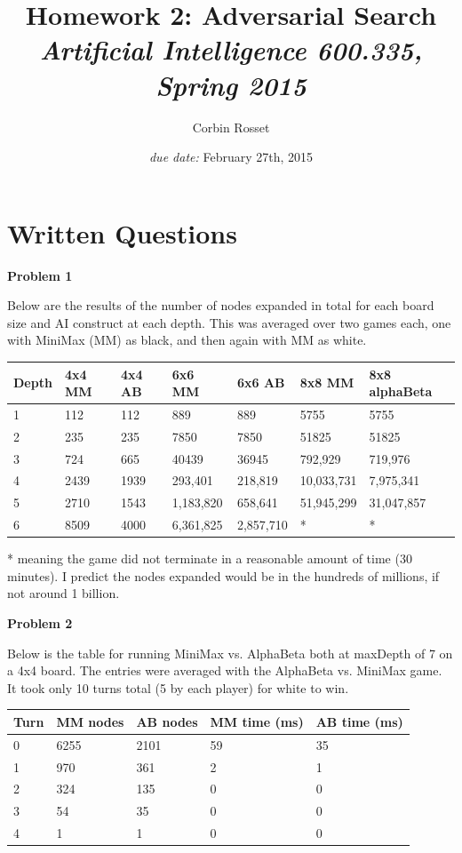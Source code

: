 \documentclass[12pt]{article}
\title{Homework 2: Adversarial Search\\ \normalsize\emph{Artificial Intelligence 600.335, Spring 2015}}
\date{\emph{due date:} February 27th, 2015}
\author{Corbin Rosset}
\makeatletter
\newcommand{\exercise}[1]{\par\vspace{4ex}\normalfont\normalsize\noindent
\textbf{\large Problem #1}\par\nobreak\@afterindentfalse\@afterheading\vspace{.75ex}}
\makeatother
\begin{document}
\maketitle



\section{Written Questions}

\exercise{1}
Below are the results of the number of nodes expanded in total for each board size and AI construct at each depth. This was averaged over two games each, one with MiniMax (MM) as black, and then again with MM as white. 

\begin{table}[h]
\begin{tabular}{|l|l|l|l|l|l|l|}
\hline
Depth & 4x4 MM & 4x4 AB & 6x6 MM    & 6x6 AB    & 8x8 MM     & 8x8 alphaBeta \\ \hline
1     & 112    & 112    & 889       & 889       & 5755       & 5755          \\ \hline
2     & 235    & 235    & 7850      & 7850      & 51825      & 51825         \\ \hline
3     & 724    & 665    & 40439     & 36945     & 792,929    & 719,976       \\ \hline
4     & 2439   & 1939   & 293,401   & 218,819   & 10,033,731 & 7,975,341     \\ \hline
5     & 2710   & 1543   & 1,183,820 & 658,641   & 51,945,299 & 31,047,857    \\ \hline
6     & 8509   & 4000   & 6,361,825 & 2,857,710 & *          & *             \\ \hline
\end{tabular}
\end{table}

* meaning the game did not terminate in a reasonable amount of time (30 minutes). I predict the nodes expanded would be in the hundreds of millions, if not around 1 billion.  
\exercise{2}
Below is the table for running MiniMax vs. AlphaBeta both at maxDepth of 7 on a 4x4 board. The entries were averaged with the AlphaBeta vs. MiniMax game. It took only 10 turns total (5 by each player) for white to win. 
\begin{table}[h]
\begin{tabular}{|l|l|l|l|l|}
\hline
Turn & MM nodes & AB nodes & MM time (ms) & AB time (ms) \\ \hline
0    & 6255     & 2101     & 59           & 35           \\ \hline
1    & 970      & 361      & 2            & 1            \\ \hline
2    & 324      & 135      & 0            & 0            \\ \hline
3    & 54       & 35       & 0            & 0            \\ \hline
4    & 1        & 1        & 0            &  0            \\ \hline
\end{tabular}
\end{table}
\end{document}
